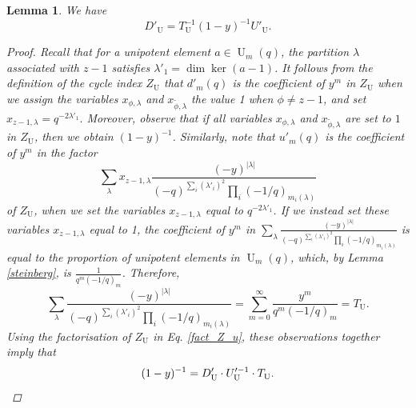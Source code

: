 \documentclass[a4paper, 12pt, oneside]{amsart}
\newtheorem{lemma}[prop]{Lemma}
\theoremstyle{definition}
\DeclareMathOperator{\U}{U}
\begin{document}
\begin{lemma}
\label{fact_D'_u}
We have
$$D'_{\U}=T^{-1}_{\U}(1-y)^{-1}U'_{\U}.$$
\begin{proof}
Recall that for a unipotent element $a \in \U_m(q)$, the partition $\lambda$ associated with $z-1$ satisfies $\lambda'_1=\dim \ker(a-1)$. It follows from the definition of the cycle index $Z_{\U}$ 
 that $d'_m(q)$ is the coefficient of $y^m$ in $Z_{\U}$ when we assign the variables $x_{\phi,\lambda}$ and $x_{\widetilde{\phi},\lambda}$ the value 1 when $\phi \neq z-1$, and set $x_{z-1,\lambda}=q^{-2\lambda'_1}.$
 Moreover, observe that if all variables $x_{\phi,\lambda}$ and $x_{\widetilde{\phi},\lambda}$ are set to $1$ in $Z_{\U}$, then we obtain $(1-y)^{-1}$. Similarly, note that $u'_m(q)$ is the coefficient of $y^m$ in the factor 
  $$\sum_{\lambda}x_{z-1,\lambda}\frac{(-y)^{|\lambda|}}{(-q)^{\sum_{i}(\lambda'_i)^2}\prod_i(-1/q)_{m_i(\lambda)}}$$
of $Z_{\U}$, when we set the variables $x_{z-1,\lambda}$ equal to $q^{-2\lambda'_1}$. If we instead set these variables $x_{z-1,\lambda}$ equal to 1,
the coefficient of $y^m$ in $\sum_{\lambda}\frac{(-y)^{|\lambda|}}{(-q)^{\sum_{i}(\lambda'_i)^2}\prod_i(-1/q)_{m_i(\lambda)}}$ is equal to the proportion of unipotent elements in $\U_m(q)$, which, by Lemma \ref{steinberg}, is $\frac{1}{q^m(-1/q)_m}$.
Therefore, 
 $$\sum_{\lambda}\frac{(-y)^{|\lambda|}}{(-q)^{\sum_{i}(\lambda'_i)^2}\prod_i(-1/q)_{m_i(\lambda)}}=
 \sum_{m=0}^{\infty}\frac{y^m}{q^m(-1/q)_m}=T_{\U}.$$
Using the factorisation of $Z_{\U}$ in Eq. \eqref{fact_Z_u}, these observations together imply that
 \begin{equation*}
 (1-y)^{-1}=D'_{\U}\cdot U'^{-1}_{\U} \cdot T_{\U}. \qedhere 
\end{equation*}
\end{proof}
\end{lemma}
\end{document}
